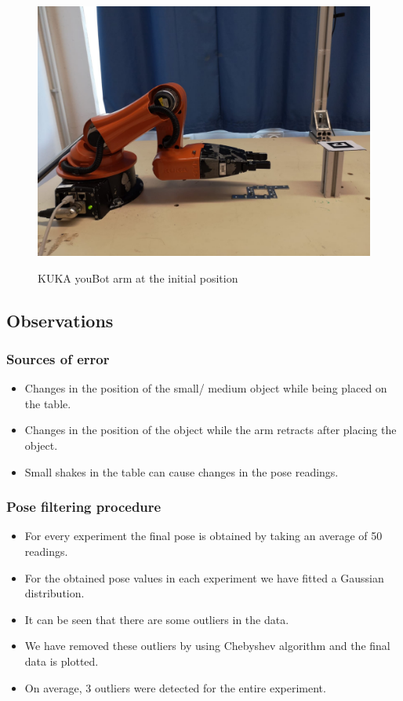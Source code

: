 \documentclass[11pt,a4paper]{article}
\begin{document}
				\begin{figure}[H]
					\centering
					\includegraphics[scale=0.2]{youbot_2}
					\label{Youbot}
					\caption{KUKA youBot arm at the initial position}
				\end{figure}
				\subsection{Observations}
				\subsubsection{Sources of error}
				\begin{itemize}
				\item Changes in the position of the small/ medium object while being placed on the table.
				\item Changes in the position of the object while the arm retracts after placing the object.
				\item Small shakes in the table can cause changes in the pose readings.
				\end{itemize}
				\subsubsection{Pose filtering procedure}
				\begin{itemize}
				\item For every experiment the final pose is obtained by taking an average of 50 readings.
				\item For the obtained pose values in each experiment we have fitted a Gaussian distribution.
				\item It can be seen that there are some outliers in the data.
				\item We have removed these outliers by using Chebyshev algorithm and the final data is plotted.
				\item On average, 3 outliers were detected for the entire experiment.
				\end{itemize}
\end{document}
